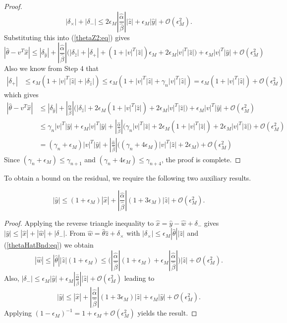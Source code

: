 \documentclass{siamltex}
\newcommand{\eqnref}[1]{(\ref{#1})}
\newcommand{\eps}{\epsilon}
\begin{document}
\begin{proof}
\begin{equation} \label{twoDelta:eq}
|\delta_{\times}| + |\delta_-| \leq 2 \eps_M |\frac{\hat \alpha}{\hat \beta}| |\hat z|  + \eps_M |\hat y| +  \mathcal{O}(\eps_M^2).
\end{equation}
Substituting this into \eqnref{thetaZ2:eq} gives
\[
|\hat \theta - v^T \hat x| \leq
 |\delta_{\hat y}| + |\frac{\hat \alpha}{\hat \beta}| \Big( |\delta_{\hat z}|  + |\delta_{+}| + (1 + |v|^T |\hat z|) \eps_M + 2 \eps_M |v|^T |\hat z| \Big) + \eps_M |v|^T |\hat y| +  \mathcal{O}(\eps_M^2)
\]
Also we know from Step 4 that
\begin{align*}
|\delta_{+}|  &\leq \eps_M (1 + |v|^T |\hat z| + |\delta_{\hat z}|) 
\leq \eps_M (1 + |v|^T |\hat z| + \gamma_n |v|^T |\hat z|) = \eps_M (1 + |v|^T |\hat z|) + \mathcal{O}(\eps_M^2)
\end{align*}
which gives
\begin{align*}
|\hat \theta - v^T \hat x| & \leq
 |\delta_{\hat y}| + |\frac{\hat \alpha}{\hat \beta}| \Big( |\delta_{\hat z}|  + 2 \eps_M (1 + |v|^T |\hat z|) + 2 \eps_M |v|^T |\hat z| \Big) + \eps_M |v|^T |\hat y| +  \mathcal{O}(\eps_M^2)\\
 & \leq  \gamma_n |v|^T |\hat y| + \eps_M |v|^T |\hat y| + |\frac{\hat \alpha}{\hat \beta}| \Big( \gamma_n |v|^T |\hat z|  + 2 \eps_M (1 + |v|^T |\hat z|) + 2 \eps_M |v|^T |\hat z| \Big)  +  \mathcal{O}(\eps_M^2)\\
 & =  (\gamma_n + \eps_M) |v|^T |\hat y| + |\frac{\hat \alpha}{\hat \beta}| \Big( (\gamma_n + 4 \eps_M) |v|^T |\hat z|  + 2 \eps_M \Big)  +  \mathcal{O}(\eps_M^2)
\end{align*}
Since $(\gamma_n + \eps_M) \leq \gamma_{n+1}$ and  $(\gamma_n + 4\eps_M) \leq \gamma_{n+4}$, the proof is complete.
\end{proof}

To obtain a bound on the residual, we require the following two auxiliary results.
\begin{lemma}
\begin{equation} \label{yHatBnd:eq}
|\hat y| \leq (1 + \eps_M) |\hat x| + |\frac{\hat \alpha}{\hat \beta}| (1 + 3\eps_M) |\hat z| + \mathcal{O}(\eps_M^2).
\end{equation}
\end{lemma}
\begin{proof}
Applying the reverse triangle inequality to $\hat x = \hat y - \hat w + \delta_{-}$ gives
$|\hat y| \leq  |\hat x| + |\hat w| + |\delta_-| $. From  $\hat w = \hat \theta \hat z + \delta_{\times}$ with $|\delta_{\times}| \leq \eps_M |\hat \theta| |\hat z|$ and \eqnref{thetaHatBnd:eq}
we obtain
\[
|\hat w| \leq |\hat \theta| |\hat z| (1 + \eps_M)
  \leq \Big( |\frac{\hat \alpha}{\hat \beta}| (1 + \eps_M) + \eps_M  |\frac{\hat \alpha}{\hat \beta}| \Big) |\hat z| + \mathcal{O}(\eps_M^2).
\]
Also, $|\delta_-| \leq \eps_M |\hat y| + \eps_M |\frac{\hat \alpha}{\hat \beta}|  |\hat z| + \mathcal{O}(\eps_M^2)$ leading to
\[
|\hat y| \leq |\hat x| + |\frac{\hat \alpha}{\hat \beta}| (1 + 3\eps_M) |\hat z| + \eps_M |\hat y|  + \mathcal{O}(\eps_M^2).
\]
Applying $(1-\eps_M)^{-1} = 1 + \eps_M + \mathcal{O}(\eps_M^2)$ yields the result.
\end{proof}
\end{document}

